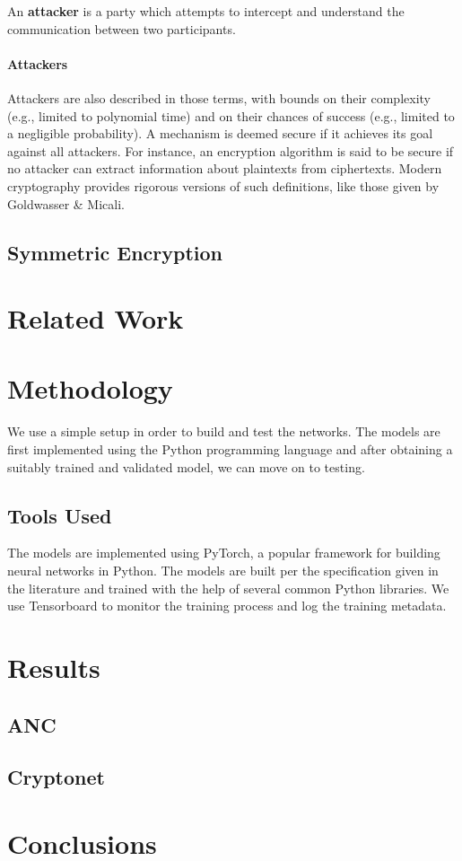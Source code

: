 \documentclass[a4paper]{article}
\begin{document}
    An {\bf attacker} is a party which attempts to intercept and understand the
    communication between two participants.
  
  \paragraph{Attackers}
  Attackers are also described in those terms, with bounds on their complexity 
  (e.g., limited to polynomial time) and on their chances of success 
  (e.g., limited to a negligible probability). A mechanism is deemed secure if 
  it achieves its goal against all attackers. For instance, an encryption
  algorithm is said to be secure if no attacker can extract information about 
  plaintexts from ciphertexts.
  Modern cryptography provides rigorous versions of such definitions, like those 
  given by Goldwasser \& Micali. \cite{Goldwasser}

    \subsection{Symmetric Encryption}
    

  
  \section{Related Work}
  
  \section{Methodology}
  We use a simple setup in order to build and test the networks. The models are 
  first implemented using the Python programming language and after obtaining a 
  suitably trained and validated model, we can move on to testing. 

    \subsection{Tools Used}
    The models are implemented using PyTorch, a popular framework for building
    neural networks in Python. The models are built per the specification given in
    the literature and trained with the help of several common Python libraries.
    We use Tensorboard to monitor the training process and log the training metadata.

  
  \section{Results}
    \subsection{ANC}
    \subsection{Cryptonet}
  
  \section{Conclusions}

  
  
\end{document}
